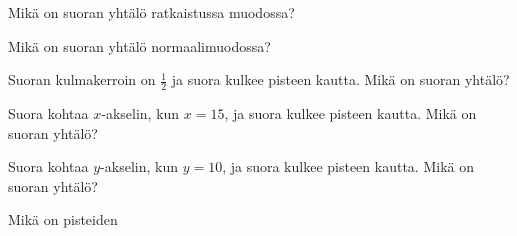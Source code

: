\begin{tehtavasivu}

\sarjaA %

\begin{tehtava}
Mikä on suoran yhtälö ratkaistussa muodossa?
\begin{vastaus}
\end{vastaus}
\end{tehtava}

\begin{tehtava}
Mikä on suoran yhtälö normaalimuodossa?
\begin{vastaus}
\end{vastaus}
\end{tehtava}

\begin{tehtava}
Suoran kulmakerroin on $\frac{1}{2}$ ja suora kulkee pisteen
kautta. Mikä on suoran yhtälö?
\begin{vastaus}
\end{vastaus}
\end{tehtava}

\begin{tehtava}
Suora kohtaa $x$-akselin, kun $x=15$, ja suora kulkee pisteen
kautta. Mikä on suoran yhtälö?
\begin{vastaus}
\end{vastaus}
\end{tehtava}

\begin{tehtava}
Suora kohtaa $y$-akselin, kun $y=10$, ja suora kulkee pisteen
kautta. Mikä on suoran yhtälö?
\begin{vastaus}
\end{vastaus}
\end{tehtava}

\begin{tehtava}
Mikä on pisteiden
\begin{vastaus}
\end{vastaus}
\end{tehtava}


\end{tehtavasivu}
